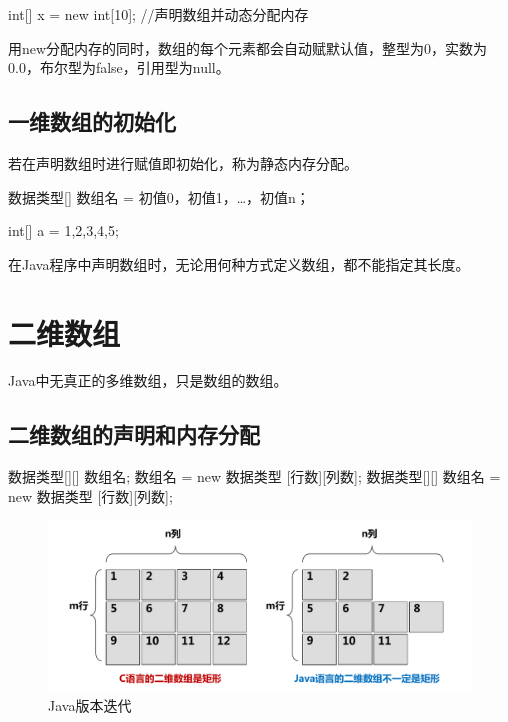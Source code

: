 \begin{javaCode}
  int[] x = new int[10];   //声明数组并动态分配内存
\end{javaCode}


用new分配内存的同时，数组的每个元素都会自动赋默认值，整型为0，实数为0.0，布尔型为false，引用型为null。

\subsection{一维数组的初始化}

若在声明数组时进行赋值即初始化，称为静态内存分配。

\begin{javaCode}
  数据类型[] 数组名 = {初值0，初值1，…，初值n}；
\end{javaCode}


\begin{javaCode}
  int[] a = {1,2,3,4,5};
\end{javaCode}


在Java程序中声明数组时，无论用何种方式定义数组，都不能指定其长度。

\section{二维数组}

Java中无真正的多维数组，只是数组的数组。

\subsection{二维数组的声明和内存分配}

\begin{javaCode}
  数据类型[][] 数组名;
  数组名 = new 数据类型 [行数][列数];
  数据类型[][] 数组名 = new 数据类型 [行数][列数];
\end{javaCode}

\begin{figure}[htb]
\centering
\includegraphics[width=\textwidth]{images/Java-array-and-string/fig-2-dim-array.pdf}
\caption{Java版本迭代}
\label{fig:java-versions}
\end{figure}

